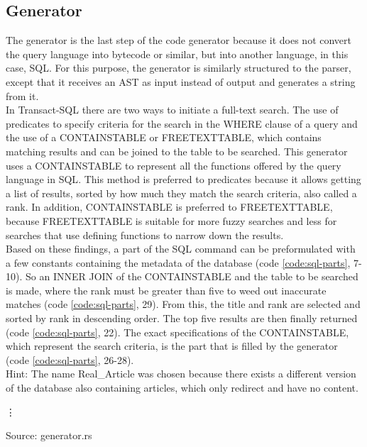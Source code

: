 \subsection{Generator}
The generator is the last step of the code generator because it does not convert the query language into bytecode or similar, but into another language, in this case, \ac{SQL}. For this purpose, the generator is similarly structured to the parser, except that it receives an \ac{AST} as input instead of output and generates a string from it.\\
In Transact-\ac{SQL} there are two ways to initiate a full-text search. The use of predicates to specify criteria for the search in the WHERE clause of a query and the use of a CONTAINSTABLE or FREETEXTTABLE, which contains matching results and can be joined to the table to be searched. This generator uses a CONTAINSTABLE to represent all the functions offered by the query language in \ac{SQL}. This method is preferred to predicates because it allows getting a list of results, sorted by how much they match the search criteria, also called a rank. In addition, CONTAINSTABLE is preferred to FREETEXTTABLE, because FREETEXTTABLE is suitable for more fuzzy searches and less for searches that use defining functions to narrow down the results.\\
Based on these findings, a part of the SQL command can be preformulated with a few constants containing the metadata of the database (code \ref{code:sql-parts}, 7-10). So an INNER JOIN of the CONTAINSTABLE and the table to be searched is made, where the rank must be greater than five to weed out inaccurate matches (code \ref{code:sql-parts}, 29). From this, the title and rank are selected and sorted by rank in descending order. The top five results are then finally returned (code \ref{code:sql-parts}, 22). The exact specifications of the CONTAINSTABLE, which represent the search criteria, is the part that is filled by the generator (code \ref{code:sql-parts}, 26-28).\\
Hint: The name Real\_Article was chosen because there exists a different version of the database also containing articles, which only redirect and have no content.
\begin{codeenv}
    \label{code:sql-parts}
    
    \vdots
    
    \centerline{Source: generator.rs}
\end{codeenv}
